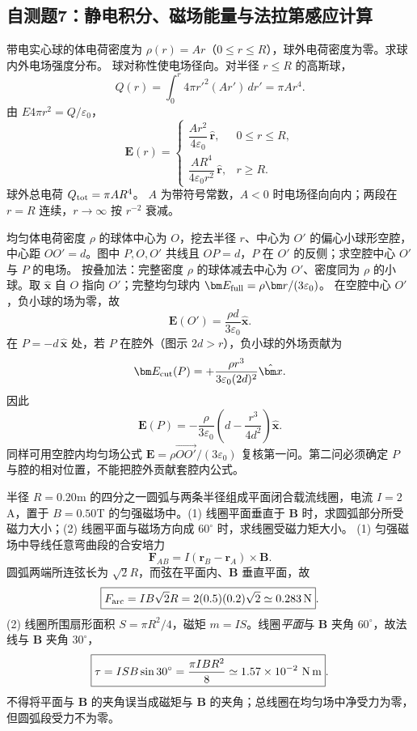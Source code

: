 \subsection{自测题7：静电积分、磁场能量与法拉第感应计算}

\problemtext 带电实心球的体电荷密度为 $\rho(r)=Ar$（$0\le r\le R$），球外电荷密度为零。求球内外电场强度分布。
\workings 球对称性使电场径向。对半径 $r\le R$ 的高斯球，
\[Q(r)=\int_0^r 4\pi r'^2(Ar')\,dr'=\pi A r^4.\]
由 $E4\pi r^2=Q/\varepsilon_0$，
\[
\boxed{\bm E(r)=
\begin{cases}
\dfrac{A r^2}{4\varepsilon_0}\,\hat{\bm r},&0\le r\le R,\\[4pt]
\dfrac{A R^4}{4\varepsilon_0r^2}\,\hat{\bm r},&r\ge R.
\end{cases}}
\]
球外总电荷 $Q_{\rm tot}=\pi AR^4$。
\crosscheck $A$ 为带符号常数，$A<0$ 时电场径向向内；两段在 $r=R$ 连续，$r\to\infty$ 按 $r^{-2}$ 衰减。

\problemtext 均匀体电荷密度 $\rho$ 的球体中心为 $O$，挖去半径 $r$、中心为 $O'$ 的偏心小球形空腔，中心距 $OO'=d$。图中 $P,O,O'$ 共线且 $OP=d$，$P$ 在 $O'$ 的反侧；求空腔中心 $O'$ 与 $P$ 的电场。
\workings 按叠加法：完整密度 $\rho$ 的球体减去中心为 $O'$、密度同为 $\rho$ 的小球。取 $\hat{\bm x}$ 自 $O$ 指向 $O'$；完整均匀球内 $\bm E_{\rm full}=\rho\bm r/(3\varepsilon_0)$。
在空腔中心 $O'$，负小球的场为零，故
\[\boxed{\bm E(O')=\frac{\rho d}{3\varepsilon_0}\hat{\bm x}}.\]
在 $P=-d\,\hat{\bm x}$ 处，若 $P$ 在腔外（图示 $2d>r$），负小球的外场贡献为
\[\bm E_{\rm cut}(P)=+\frac{\rho r^3}{3\varepsilon_0(2d)^2}\hat{\bm x}.\]
因此
\[\boxed{\bm E(P)=-\frac{\rho}{3\varepsilon_0}
\left(d-\frac{r^3}{4d^2}\right)\hat{\bm x}}.\]
\crosscheck 同样可用空腔内均匀场公式 $\bm E=\rho\overrightarrow{OO'}/(3\varepsilon_0)$ 复核第一问。第二问必须确定 $P$ 与腔的相对位置，不能把腔外贡献套腔内公式。

\problemtext 半径 $R=0.20$m 的四分之一圆弧与两条半径组成平面闭合载流线圈，电流 $I=2$A，置于 $B=0.50$T 的匀强磁场中。(1) 线圈平面垂直于 $\bm B$ 时，求圆弧部分所受磁力大小；(2) 线圈平面与磁场方向成 $60^\circ$ 时，求线圈受磁力矩大小。
\workings (1) 匀强磁场中导线任意弯曲段的合安培力
\[\bm F_{AB}=I(\bm r_B-\bm r_A)\times\bm B.\]
圆弧两端所连弦长为 $\sqrt2R$，而弦在平面内、$\bm B$ 垂直平面，故
\[\boxed{F_{\rm arc}=IB\sqrt2R=2(0.5)(0.2)\sqrt2\simeq0.283\,{\rm N}}.\]
(2) 线圈所围扇形面积 $S=\pi R^2/4$，磁矩 $m=IS$。线圈\emph{平面}与 $\bm B$ 夹角 $60^\circ$，故法线与 $\bm B$ 夹角 $30^\circ$，
\[\boxed{\tau=ISB\sin30^\circ=\frac{\pi IBR^2}{8}
\simeq1.57\times10^{-2}\ {\rm N\,m}}.\]
\crosscheck 不得将平面与 $\bm B$ 的夹角误当成磁矩与 $\bm B$ 的夹角；总线圈在均匀场中净受力为零，但圆弧段受力不为零。

